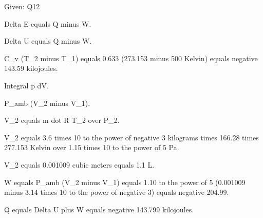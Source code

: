 Given: Q12

Delta E equals Q minus W.

Delta U equals Q minus W.

C_v (T_2 minus T_1) equals 0.633 (273.153 minus 500 Kelvin) equals negative 143.59 kilojoules.

Integral p dV.

P_amb (V_2 minus V_1).

V_2 equals m dot R T_2 over P_2.

V_2 equals 3.6 times 10 to the power of negative 3 kilograms times 166.28 times 277.153 Kelvin over 1.15 times 10 to the power of 5 Pa.

V_2 equals 0.001009 cubic meters equals 1.1 L.

W equals P_amb (V_2 minus V_1) equals 1.10 to the power of 5 (0.001009 minus 3.14 times 10 to the power of negative 3) equals negative 204.99.

Q equals Delta U plus W equals negative 143.799 kilojoules.